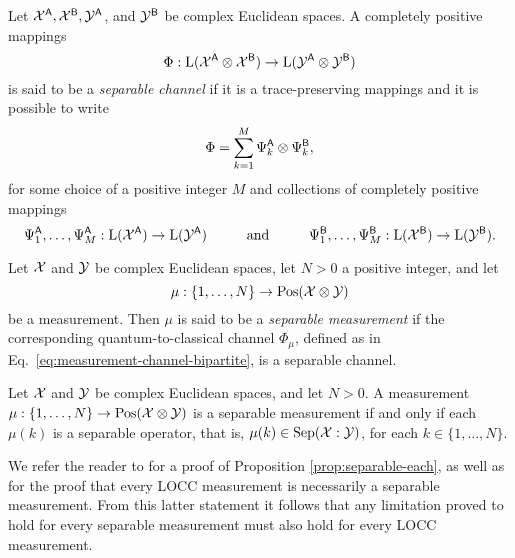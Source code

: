 \begin{definition}
Let $\mathcal{X}^{\mathsf{A}}, \mathcal{X}^{\mathsf{B}}, \mathcal{Y}^{\mathsf{A}}$, and $\mathcal{Y}^{\mathsf{B}}$ be complex
Euclidean spaces.
A completely positive mappings 
\[
  \Phi:\mathrm{L}(\mathcal{X}^{\mathsf{A}}\otimes\mathcal{X}^{\mathsf{B}})\to\mathrm{L}(\mathcal{Y}^{\mathsf{A}}\otimes\mathcal{Y}^{\mathsf{B}})
\]
is said to be a 
\emph{separable channel} if it is a trace-preserving mappings and it is possible 
to write
\begin{equation}
  \Phi = \sum_{k = 1}^{M}\Psi_{k}^{\mathsf{A}}\otimes\Psi_{k}^{\mathsf{B}},
\end{equation}
for some choice of a positive integer $M$ and collections of
completely positive mappings 
\begin{equation}
  \Psi_1^{\mathsf{A}},\ldots,\Psi_{M}^{\mathsf{A}} : \mathrm{L}(\mathcal{X}^{\mathsf{A}})\to\mathrm{L}(\mathcal{Y}^{\mathsf{A}})
  \hspace*{1cm}\mbox{and}\hspace*{1cm}
  \Psi_1^{\mathsf{B}},\ldots,\Psi_{M}^{\mathsf{B}} : \mathrm{L}(\mathcal{X}^{\mathsf{B}})\to\mathrm{L}(\mathcal{Y}^{\mathsf{B}}).
\end{equation}
\end{definition}

\begin{definition}
Let $\mathcal{X}$ and $\mathcal{Y}$ be complex Euclidean spaces, let $N > 0$ a positive integer, and let
\begin{equation}
  \mu: \{1, \ldots, N \} \rightarrow \mathrm{Pos}(\mathcal{X}\otimes\mathcal{Y})
\end{equation}
be a measurement. Then $\mu$ is said to be a \emph{separable measurement} if the 
corresponding quantum-to-classical channel $\Phi_{\mu}$, defined as in 
Eq.~\eqref{eq:measurement-channel-bipartite}, is a separable channel.
\end{definition}

\begin{prop}
\label{prop:separable-each}
Let $\mathcal{X}$ and $\mathcal{Y}$ be complex Euclidean spaces, and let $N > 0$. A measurement 
$\mu : \{1,\ldots,N\}\to\mathrm{Pos}(\mathcal{X}\otimes\mathcal{Y})$ is a separable measurement 
if and only if each $\mu(k)$ is a separable operator, that is, 
$\mu(k)\in \mathrm{Sep}(\mathcal{X}:\mathcal{Y})$, for each $k\in\{1, \ldots, N\}$.
\end{prop}

We refer the reader to \cite{Watrous15} for a proof of Proposition \ref{prop:separable-each},
as well as for the proof that every LOCC measurement is necessarily a separable measurement. 
From this latter statement it follows that any limitation proved to hold for 
every separable measurement must also hold for every LOCC measurement.


